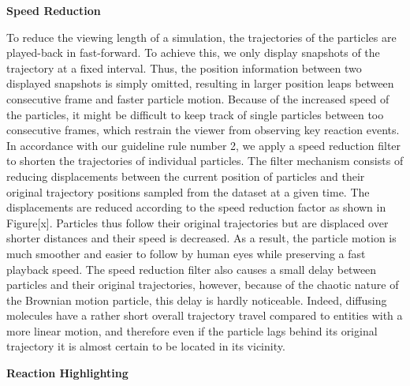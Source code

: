 \textbf{Speed Reduction}

To reduce the viewing length of a simulation, the trajectories of the particles are played-back in fast-forward.
To achieve this, we only display snapshots of the trajectory at a fixed interval.
Thus, the position information between two displayed snapshots is simply omitted, resulting in larger position leaps between consecutive frame and faster particle motion.
Because of the increased speed of the particles, it might be difficult to keep track of single particles between too consecutive frames, which restrain the viewer from observing key reaction events.
In accordance with our guideline rule number 2, we apply a speed reduction filter to shorten the trajectories of individual particles.
The filter mechanism consists of reducing displacements between the current position of particles and their original trajectory positions sampled from the dataset at a given time.
The displacements are reduced according to the speed reduction factor as shown in Figure[x].
Particles thus follow their original trajectories but are displaced over shorter distances and their speed is decreased.
As a result, the particle motion is much smoother and easier to follow by human eyes while preserving a fast playback speed.
The speed reduction filter also causes a small delay between particles and their original trajectories, however, because of the chaotic nature of the Brownian motion particle, this delay is hardly noticeable.
Indeed, diffusing molecules have a rather short overall trajectory travel compared to entities with a more linear motion, and therefore even if the particle lags behind its original trajectory it is almost certain to be located in its vicinity.


\textbf{Reaction Highlighting}

